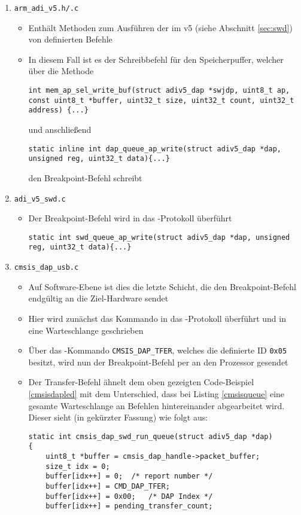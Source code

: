 \begin{enumerate}
\begin{itemize}
     \end{itemize}
     \item \texttt{arm\_adi\_v5.h/.c}
     \begin{itemize}
        \item Enthält Methoden zum Ausführen der im  v5 (siehe Abschnitt \ref{sec:swd}) von 
        definierten Befehle
        \item In diesem Fall ist es der Schreibbefehl für den Speicherpuffer, welcher über die Methode
        \begin{lstlisting}
int mem_ap_sel_write_buf(struct adiv5_dap *swjdp, uint8_t ap, const uint8_t *buffer, uint32_t size, uint32_t count, uint32_t address) {...}
        \end{lstlisting}
        und anschließend
        \begin{lstlisting}
static inline int dap_queue_ap_write(struct adiv5_dap *dap, unsigned reg, uint32_t data){...}
        \end{lstlisting}
        den Breakpoint-Befehl schreibt
     \end{itemize}
     \item \texttt{adi\_v5\_swd.c}
        \begin{itemize}
        \item Der Breakpoint-Befehl wird in das -Protokoll überführt
        \begin{lstlisting}
static int swd_queue_ap_write(struct adiv5_dap *dap, unsigned reg, uint32_t data){...}
        \end{lstlisting}
     \end{itemize}
     \item \texttt{cmsis\_dap\_usb.c}
     \begin{itemize}
        \item Auf Software-Ebene ist dies die letzte Schicht, die den Breakpoint-Befehl endgültig an die Ziel-Hardware
        sendet
        \item Hier wird zunächst das Kommando in das -Protokoll überführt und in eine Warteschlange geschrieben
        \item Über das -Kommando \texttt{CMSIS\_DAP\_TFER}, welches die definierte ID \texttt{0x05} besitzt,
        wird nun der Breakpoint-Befehl per  an den Prozessor gesendet
        \item Der Transfer-Befehl ähnelt dem oben gezeigten Code-Beispiel \ref{cmsisdapled} mit dem Unterschied, dass
        bei Listing \ref{cmsisqueue} eine gesamte Warteschlange an Befehlen hintereinander abgearbeitet wird.
        Dieser sieht (in gekürzter Fassung) wie folgt aus:
        \begin{lstlisting}[caption={OpenOCD, \texttt{cmsis\_dap\_usb.c}}, label=cmsisqueue]
static int cmsis_dap_swd_run_queue(struct adiv5_dap *dap)
{
    uint8_t *buffer = cmsis_dap_handle->packet_buffer;
    size_t idx = 0;
    buffer[idx++] = 0;	/* report number */
    buffer[idx++] = CMD_DAP_TFER;
    buffer[idx++] = 0x00;	/* DAP Index */
    buffer[idx++] = pending_transfer_count;


\end{lstlisting}
\end{itemize}
\end{enumerate}
